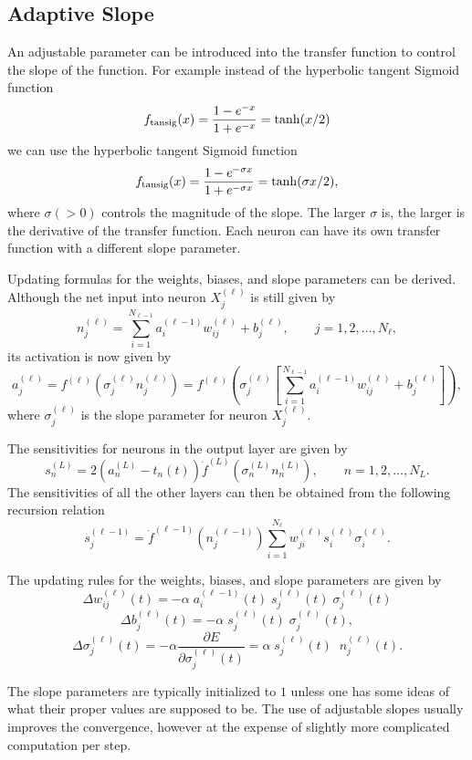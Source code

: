 \documentclass[fleqn]{article}
\begin{document}
\subsection{Adaptive Slope}

An adjustable parameter can be introduced into the transfer function to control the slope of the function.
For example
instead of the hyperbolic tangent Sigmoid function
\[
f_{\mbox{\scriptsize{tansig}}}(x) = \frac{1-e^{-x}}{1+e^{-x}} = \tanh(x/2)
\]
we can use the hyperbolic tangent Sigmoid function
\[
f_{\mbox{\scriptsize{tansig}}}(x) = \frac{1-e^{-\sigma x}}{1+e^{-\sigma x}} = \tanh(\sigma x/2),
\]
where $\sigma (>0)$ controls the magnitude of the slope.
The larger $\sigma $ is, the larger is the derivative of the transfer function.
Each neuron can have its own transfer function with a different slope parameter.


Updating formulas for the weights, biases, and slope parameters can be derived.
Although the net input into neuron $X_j^{(\ell)}$ is still given by
\[
n_j^{(\ell)} = \sum_{i=1}^{N_{\ell-1}} a_i^{(\ell-1)} w_{ij}^{(\ell)} + b_j^{(\ell)}, \qquad
j=1, 2, \ldots, N_\ell,
\]
its activation is now given by
\[
a_j^{(\ell)} = f^{(\ell)}(\sigma_j^{(\ell)} n_j^{(\ell)}) =
f^{(\ell)}\left(
\sigma_j^{(\ell)} \left[
\sum_{i=1}^{N_{\ell-1}} a_i^{(\ell-1)} w_{ij}^{(\ell)} + b_j^{(\ell)}
\right] \right),
\]
where $\sigma_j^{(\ell)}$ is the slope parameter for neuron $X_j^{(\ell)}$.

The sensitivities for neurons in the output layer are given by
\[
s_{n}^{(L)} = 2 \left( a_n^{(L)} - t_n(t) \right) \dot f^{(L)}(\sigma_n^{(L)} n_n^{(L)}),
\qquad n=1, 2, \ldots, N_L.
\]
The sensitivities of all the other layers can then be obtained from the following recursion relation
\[
s_{j}^{(\ell-1)} =
\dot f^{(\ell-1)}(n_j^{(\ell-1)}) \sum_{i=1}^{N_\ell} w_{ji}^{(\ell)} s_{i}^{(\ell)} \sigma_{i}^{(\ell)}.
\]

The updating rules for the weights, biases, and slope parameters are given by
\[
\Delta w_{ij}^{(\ell)}(t) = - \alpha \; a_i^{(\ell-1)}(t) \; s_j^{(\ell)}(t) \; \sigma_j^{(\ell)}(t)
\]
\[
\Delta b_{j}^{(\ell)}(t) =  - \alpha \; s_j^{(\ell)}(t) \; \sigma_j^{(\ell)}(t),
\]
\[
\Delta \sigma_j^{(\ell)}(t) = - \alpha \frac{\partial E}{\partial \sigma_j^{(\ell)}(t)} =
\alpha \; s_j^{(\ell)}(t) \; \; n_j^{(\ell)}(t).
\]

The slope parameters are typically initialized to $1$
unless one has some ideas of what their proper values are supposed to be.
The use of adjustable slopes usually improves the convergence, however at the expense of slightly more
complicated computation per step.
\end{document}
